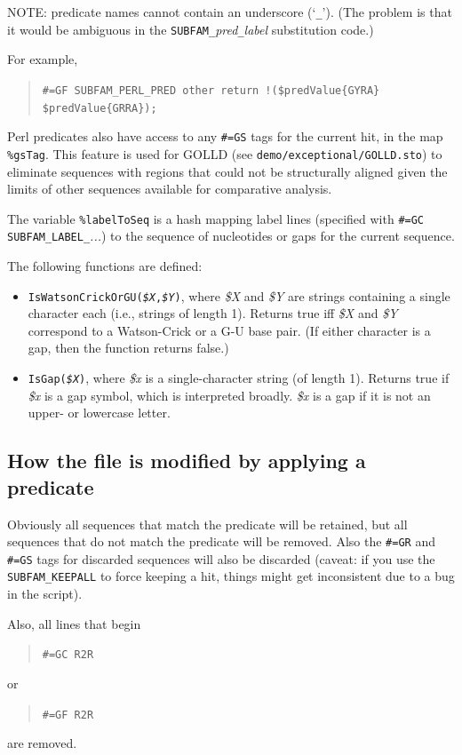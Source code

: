 \documentclass[letterpaper,12pt]{report}
\newcommand{\example}[1]{
\begin{quote}
{\raggedright
#1
}
\end{quote}
}
\begin{document}
NOTE: predicate names cannot contain an underscore
({\textquoteleft}{\tt \_}{\textquoteright}).  (The problem is that it would
be ambiguous in the {\tt SUBFAM\_}\textit{pred}{\tt \_}\textit{label} substitution
code.)

For example,

\example{{\tt \#=GF SUBFAM\_PERL\_PRED other return !(\$predValue\{GYRA\}
{\textbar}{\textbar} \$predValue\{GRRA\});}}

Perl predicates also have access to any {\tt \#=GS} tags for the current hit,
in the map {\tt \%gsTag}.  This feature is used for GOLLD (see {\tt demo/exceptional/GOLLD.sto})
to eliminate sequences with regions
that could not be structurally aligned given the limits of other sequences available for comparative analysis.

The variable {\tt \%labelToSeq} is a hash mapping label lines (specified with {\tt \#=GC SUBFAM\_LABEL\_}{\it ...}) to the sequence of nucleotides or gaps for the current sequence.

The following functions are defined:
\begin{itemize}
\item {\tt IsWatsonCrickOrGU({\it \$X},{\it \$Y})}, where {\it \$X} and {\it \$Y} are strings containing a single character each (i.e., strings of length 1).  Returns true iff {\it \$X} and {\it \$Y} correspond to a Watson-Crick or a G-U base pair.  (If either character is a gap, then the function returns false.)
\item {\tt IsGap({\it \$X})}, where {\it \$x} is a single-character string (of length 1).  Returns true if {\it \$x} is a gap symbol, which is interpreted broadly.  {\it \$x} is a gap if it is not an upper- or lowercase letter.
\end{itemize}

\subsection{How the file is modified by applying a predicate}
\label{sec:predmod}
Obviously all sequences that match the predicate will be retained, but
all sequences that do not match the predicate will be removed.  Also
the {\tt \#=GR} and {\tt \#=GS} tags for discarded sequences will also
be discarded (caveat: if you use the {\tt SUBFAM\_KEEPALL} to force keeping a hit, things might get inconsistent due to a bug in the script).

Also, all lines that begin 
\example{{\tt \#=GC R2R}}
or 
\example{{\tt \#=GF R2R}}
are removed.
\end{document}
